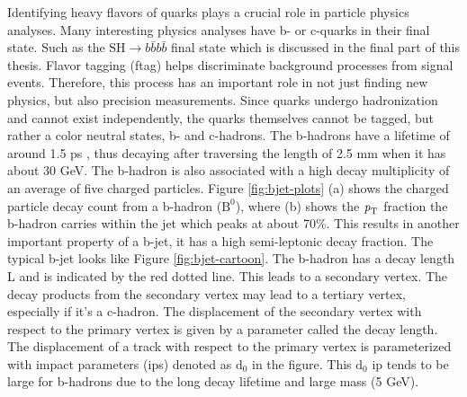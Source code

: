 Identifying heavy flavors of quarks plays a crucial role in particle physics analyses. Many interesting physics analyses have b- or c-quarks in their final state. Such as the 
$\textrm{SH} \rightarrow b \bar{b} b \bar{b}$ final state which is discussed in the final part of this thesis.
Flavor tagging (\gls{ftag}) helps discriminate background processes from signal events. Therefore, this process has an important role in not just finding new physics, but also 
precision measurements. 
Since quarks undergo hadronization and cannot exist independently, the quarks themselves cannot be tagged, but rather a color neutral states, b- and c-hadrons. The b-hadrons 
have a lifetime of around 1.5 ps \cite{review-of-hep}, thus decaying after traversing the length of 2.5 mm when it has about 30 GeV. The b-hadron is also associated with a high decay multiplicity of 
an average of five charged particles. Figure \ref{fig:bjet-plots} (a) shows the charged particle decay count from a b-hadron ($\textrm{B}^{\textrm{0}}$), where (b) shows the $\textrm{\textit{p}}_{\textrm{T}}$
fraction the b-hadron carries within the jet which peaks at about 70\%. This results in another important property of a b-jet, it has a high semi-leptonic decay fraction. The typical 
b-jet looks like Figure \ref{fig:bjet-cartoon}. The b-hadron has a decay length L and is indicated by the red dotted line. This leads to a secondary vertex. The decay products from the secondary 
vertex may lead to a tertiary vertex, especially if it's a c-hadron. The displacement of the secondary vertex with respect to the primary vertex is given by a parameter called 
the decay length. The displacement of a track with respect to the primary vertex is parameterized with impact parameters (\gls{ip}s) denoted as $\textrm{d}_{\textrm{0}}$ in 
the figure. This $\textrm{d}_{\textrm{0}}$ \gls{ip} tends to be large for b-hadrons due to the long decay lifetime and large mass (5 GeV). 
\par

